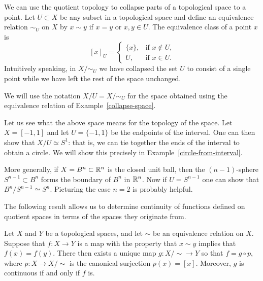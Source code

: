 \begin{example}
  \label{collapse-space}
  We can use the quotient topology to collapse parts of a topological space to a point. Let $U \subset X$ be any subset in a topological space and define an equivalence relation $\sim_U$ on $X$ by $x \sim y$ if $x = y$ or $x,y \in U$. The equivalence class of a point $x$ is
  \[
    [x]_U = \begin{cases} \{x\},& \text{if $x \notin U$,} \\ U,& \text{if $x \in U$.} \end{cases}
  \]
  Intuitively speaking, in $X/\!\sim_U$ we have collapsed the set $U$ to consist of a single point while we have left the rest of the space unchanged.
\end{example}
We will use the notation $X/U = X/\!\sim_U$ for the space obtained using the equivalence relation of Example~\ref{collapse-space}.
\begin{example}
  Let us see what the above space means for the topology of the space. Let $X = [-1,1]$ and let $U = \{-1,1\}$ be the endpoints of the interval. One can then show that $X/U \simeq S^1$: that is, we can tie together the ends of the interval to obtain a circle. We will show this precisely in Example~\ref{circle-from-interval}.
  
  More generally, if $X = B^n \subset \mathbb{R}^n$ is the closed unit ball, then the $(n-1)$-sphere $S^{n-1} \subset B^n$ forms the boundary of $B^n$ in $\mathbb{R}^n$. Now if $U = S^{n-1}$ one can show that $B^n/S^{n-1} \simeq S^n$. Picturing the case $n = 2$ is probably helpful.
\end{example}
The following result allows us to determine continuity of functions defined on quotient spaces in terms of the spaces they originate from.
\begin{lem}
  \label{universal-property-quotients}
  Let $X$ and $Y$ be a topological spaces, and let $\sim$ be an equivalence relation on $X$. Suppose that $f : X \to Y$ is a map with the property that $x \sim y$ implies that $f(x) = f(y)$. There then exists a unique map $g : X /\!\sim \to Y$ so that $f = g \circ p$, where $p : X \to X/\!\sim$ is the canonical surjection $p(x) = [x]$. Moreover, $g$ is continuous if and only if $f$ is.
\end{lem}
